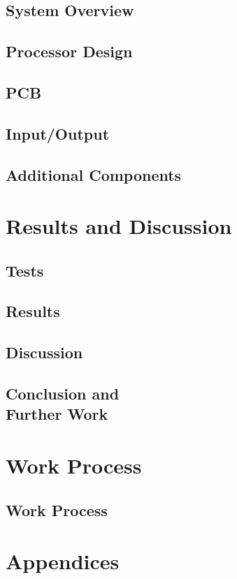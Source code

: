 \documentclass{report}
\begin{document}
\chapter{System Overview}
    

\chapter{Processor Design}
	

\chapter{PCB}
	

\chapter{Input/Output}
	

\chapter{Additional Components}
    

\part{Results and Discussion}

\chapter{Tests}
	

\chapter{Results}
	

\chapter{Discussion}
	

\chapter{Conclusion and \protect\\ Further Work}


\part{Work Process}


\chapter{Work Process}
	

\printglossaries

\part{Appendices}
	



\nocite{*}
\end{document}
